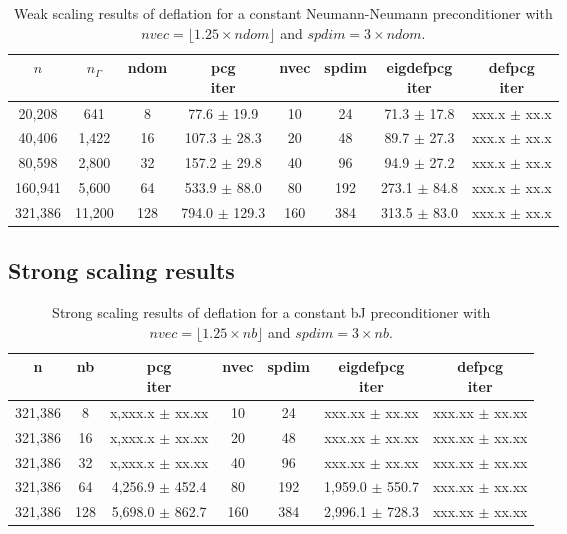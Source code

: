 \documentclass{article}
\begin{document}
\begin{table}[ht]
	\caption{Weak scaling results of deflation for a constant Neumann-Neumann preconditioner with $nvec=\lfloor1.25\times ndom\rfloor$ and $spdim=3\times ndom$.}
	\centering
	\begin{tabular}{|c|c|c|c|c|c|c|c|}
	\hline
	$n$ & $n_\Gamma$ & ndom & \makecell{pcg\\ iter} & nvec & spdim & \makecell{eigdefpcg\\ iter} & \makecell{defpcg\\ iter}\\
	\hline
	20,208  & 641    &   8 &  77.6 $\pm$  19.9 &  10 &  24  & 71.3 $\pm$ 17.8 & xxx.x $\pm$ xx.x \\
	40,406  & 1,422  &  16 & 107.3 $\pm$  28.3 &  20 &  48  & 89.7 $\pm$ 27.3 & xxx.x $\pm$ xx.x \\
	80,598  & 2,800  &  32 & 157.2 $\pm$  29.8 &  40 &  96 &  94.9 $\pm$ 27.2 & xxx.x $\pm$ xx.x \\
	160,941 & 5,600  &  64 & 533.9 $\pm$  88.0 &  80 & 192 & 273.1 $\pm$ 84.8 & xxx.x $\pm$ xx.x \\
	321,386 & 11,200 & 128 & 794.0 $\pm$ 129.3 & 160 & 384 & 313.5 $\pm$ 83.0 & xxx.x $\pm$ xx.x \\
	\hline
    \end{tabular}
	\label{Tab:025}
\end{table}

\subsection{Strong scaling results}


\begin{table}[ht]
	\caption{Strong scaling results of deflation for a constant bJ preconditioner with $nvec=\lfloor1.25\times nb\rfloor$ and $spdim=3\times nb$.}
	\centering
	\begin{tabular}{|c|c|c|c|c|c|c|}
		\hline
		n & nb & \makecell{pcg\\ iter} & nvec & spdim & \makecell{eigdefpcg\\ iter} & \makecell{defpcg\\ iter}\\
		\hline
		321,386 &   8 & x,xxx.x $\pm$ xx.xx &  10 &  24 & xxx.xx $\pm$ xx.xx & xxx.xx $\pm$ xx.xx \\
        321,386 &  16 & x,xxx.x $\pm$ xx.xx &  20 &  48 & xxx.xx $\pm$ xx.xx & xxx.xx $\pm$ xx.xx \\
        321,386 &  32 & x,xxx.x $\pm$ xx.xx &  40 &  96 & xxx.xx $\pm$ xx.xx & xxx.xx $\pm$ xx.xx \\
        321,386 &  64 & 4,256.9 $\pm$ 452.4 &  80 & 192 & 1,959.0 $\pm$ 550.7 & xxx.xx $\pm$ xx.xx \\
		321,386 & 128 & 5,698.0 $\pm$ 862.7 & 160 & 384 & 2,996.1 $\pm$ 728.3 & xxx.xx $\pm$ xx.xx \\
		\hline
	\end{tabular}
	\label{Tab:030}
\end{table}
\end{document}
